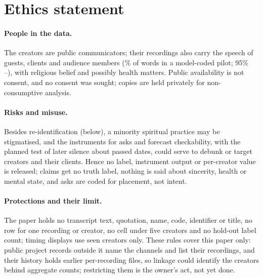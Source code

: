 
\section*{Ethics statement}
\label{sec:ethics}

\paragraph{People in the data.} The creators are public communicators; their recordings also carry the speech of guests, clients and audience members (\ThirdPartySharePct\% of words in a model-coded pilot; 95\% \ThirdPartyShareLo--\ThirdPartyShareHi), with religious belief and possibly health matters. Public availability is not consent, and no consent was sought; copies are held privately for non-consumptive analysis.

\paragraph{Risks and misuse.} Besides re-identification (below), a minority spiritual practice may be stigmatised, and the instruments for asks and forecast checkability, with the planned test of later silence about passed dates, could serve to debunk or target creators and their clients. Hence no label, instrument output or per-creator value is released; claims get no truth label, nothing is said about sincerity, health or mental state, and asks are coded for placement, not intent.

\paragraph{Protections and their limit.} The paper holds no transcript text, quotation, name, code, identifier or title, no row for one recording or creator, no cell under five creators and no hold-out label count; timing displays use seen creators only. These rules cover this paper only: public project records outside it name the channels and list their recordings, and their history holds earlier per-recording files, so linkage could identify the creators behind aggregate counts; restricting them is the owner's act, not yet done.

